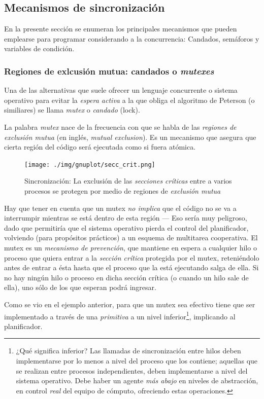 \documentclass[11pt,fleqn]{book} %
\begin{document}
\subsection{Mecanismos de sincronización}
\label{sec-3-3-3}


En la presente sección se enumeran los principales mecanismos que
pueden emplearse para programar considerando a la concurrencia:
Candados, semáforos y variables de condición.
\subsubsection{Regiones de exlcusión mutua: candados o \emph{mutexes}}
\label{sec-3-3-3-1}


Una de las alternativas que suele ofrecer un lenguaje concurrente o
sistema operativo para evitar la \emph{espera activa} a la que obliga el
algoritmo de Peterson (o similiares) se llama \emph{mutex} o \emph{candado}
(lock).

La palabra \emph{mutex} nace de la frecuencia con que se habla de las
\emph{regiones de exclusión mutua} (en inglés, \emph{mutual exclusion}). Es un
mecanismo que asegura que cierta región del código será ejecutada
como si fuera atómica.

\begin{figure}[htb]
\centering
\texttt{[image: ./img/gnuplot/secc\_crit.png]}
\caption{\label{PROC_secc_crit}Sincronización: La exclusión de las \emph{secciones críticas} entre a varios procesos se protegen por medio de regiones de \emph{exclusión mutua}}
\end{figure}

Hay que tener en cuenta que un mutex \emph{no implica} que el código no se
va a interrumpir mientras se está dentro de esta región — Eso sería
muy peligroso, dado que permitiría que el sistema operativo pierda el
control del planificador, volviendo (para propósitos prácticos) a un
esquema de multitarea cooperativa. El mutex es un \emph{mecanismo de prevención}, que mantiene en espera a cualquier hilo o proceso que
quiera entrar a la \emph{sección crítica} protegida por el mutex,
 reteniéndolo antes de entrar a
ésta hasta que el proceso que la está
ejecutando salga de ella. Si no hay ningún hilo o proceso en dicha
sección crítica (o cuando un hilo sale de ella), uno
sólo de los que esperan podrá ingresar.

Como se vio en el ejemplo anterior, para que un mutex sea efectivo
tiene que ser implementado a través de una \emph{primitiva} a un nivel
inferior\footnote{¿Qué significa inferior? Las llamadas de sincronización
entre hilos deben implementarse por lo menos a nivel del proceso que
los contiene; aquellas que se realizan entre procesos independientes,
deben implementarse a nivel del sistema operativo. Debe haber un
agente \emph{más abajo} en niveles de abstracción, en control \emph{real} del
equipo de cómputo, ofreciendo estas operaciones. }, implicando al
planificador.
\end{document}
